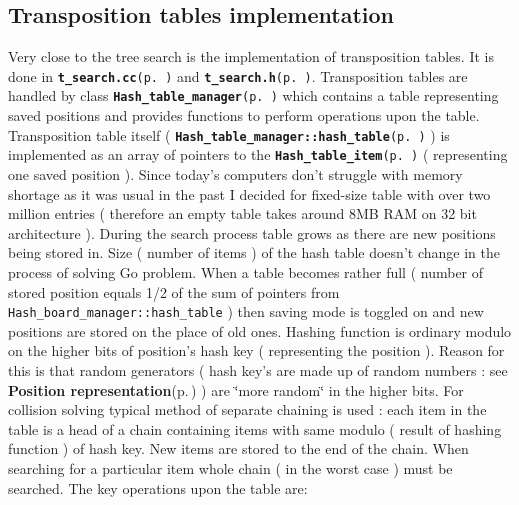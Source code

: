 \subsection{Transposition tables implementation}\label{page_3_page__1_section_2}
Very close to the tree search is the implementation of transposition tables. It is done in {\tt {\bf t\_\-search.cc}{\rm (p.\,\pageref{t__search_8cc})}} and {\tt {\bf t\_\-search.h}{\rm (p.\,\pageref{t__search_8h})}}. Transposition tables are handled by class {\tt {\bf Hash\_\-table\_\-manager}{\rm (p.\,\pageref{classHash__table__manager})}} which contains a table representing saved positions and provides functions to perform operations upon the table. Transposition table itself ( {\tt {\bf Hash\_\-table\_\-manager::hash\_\-table}{\rm (p.\,\pageref{classHash__table__manager_r1})}} ) is implemented as an array of pointers to the {\tt {\bf Hash\_\-table\_\-item}{\rm (p.\,\pageref{classHash__table__item})}} ( representing one saved position ). Since today's computers don't struggle with memory shortage as it was usual in the past I decided for fixed-size table with over two million entries ( therefore an empty table takes around 8MB RAM on 32 bit architecture ). During the search process table grows as there are new positions being stored in. Size ( number of items ) of the hash table doesn't change in the process of solving Go problem. When a table becomes rather full ( number of stored position equals 1/2 of the sum of pointers from {\tt Hash\_\-board\_\-manager::hash\_\-table} ) then saving mode is toggled on and new positions are stored on the place of old ones. Hashing function is ordinary modulo on the higher bits of position's hash key ( representing the position ). Reason for this is that random generators ( hash key's are made up of random numbers : see {\bf Position representation}{\rm (p.\,\pageref{page_6})} ) are \char`\"{}more random\char`\"{} in the higher bits. For collision solving typical method of separate chaining is used : each item in the table is a head of a chain containing items with same modulo ( result of hashing function ) of hash key. New items are stored to the end of the chain. When searching for a particular item whole chain ( in the worst case ) must be searched. The key operations upon the table are:

